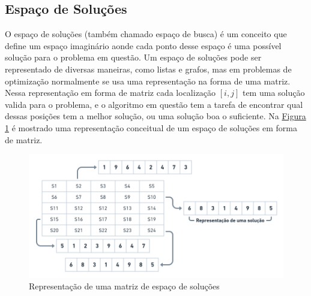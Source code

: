 \subsection{Espaço de Soluções}
O espaço de soluções (também chamado espaço de busca) é um conceito que define um espaço imaginário aonde cada ponto desse espaço é uma possível solução para o problema em questão. 
Um espaço de soluções pode ser representado de diversas maneiras, como listas e grafos, mas em problemas de optimização normalmente se usa uma representação na forma de uma matriz.\\
\indent Nessa representação em forma de matriz cada localização $[i, j]$ tem uma solução valida para o problema, e o algoritmo em questão tem a tarefa de encontrar qual dessas posições tem a melhor solução, ou uma solução boa o suficiente. Na 
\hyperref[fig:solution-space]{Figura \ref{fig:solution-space}} 
é mostrado uma representação conceitual de um espaço de soluções em forma de matriz.\hfill
            
\begin{figure}[ht]
    \centering
    \caption{Representação de uma matriz de espaço de soluções}
    \label{fig:solution-space}
    \includegraphics[width=\textwidth]{assets/solution.png}
\end{figure}

